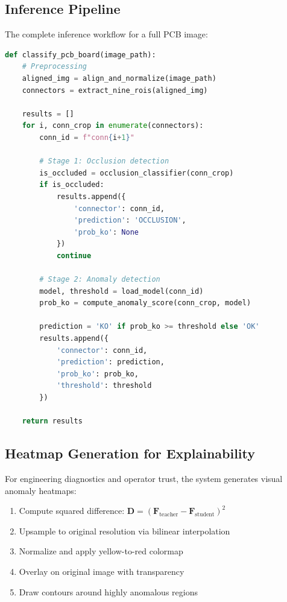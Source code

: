 \documentclass[11pt,a4paper,draft]{article}
\begin{document}
\subsection{Inference Pipeline}

The complete inference workflow for a full PCB image:

\begin{lstlisting}[language=Python, caption=Inference pipeline pseudocode]
def classify_pcb_board(image_path):
    # Preprocessing
    aligned_img = align_and_normalize(image_path)
    connectors = extract_nine_rois(aligned_img)
    
    results = []
    for i, conn_crop in enumerate(connectors):
        conn_id = f"conn{i+1}"
        
        # Stage 1: Occlusion detection
        is_occluded = occlusion_classifier(conn_crop)
        if is_occluded:
            results.append({
                'connector': conn_id,
                'prediction': 'OCCLUSION',
                'prob_ko': None
            })
            continue
        
        # Stage 2: Anomaly detection
        model, threshold = load_model(conn_id)
        prob_ko = compute_anomaly_score(conn_crop, model)
        
        prediction = 'KO' if prob_ko >= threshold else 'OK'
        results.append({
            'connector': conn_id,
            'prediction': prediction,
            'prob_ko': prob_ko,
            'threshold': threshold
        })
    
    return results
\end{lstlisting}

\subsection{Heatmap Generation for Explainability}

For engineering diagnostics and operator trust, the system generates visual anomaly heatmaps:

\begin{enumerate}
    \item Compute squared difference: $\mathbf{D} = (\mathbf{F}_{\text{teacher}} - \mathbf{F}_{\text{student}})^2$
    \item Upsample to original resolution via bilinear interpolation
    \item Normalize and apply yellow-to-red colormap
    \item Overlay on original image with transparency
    \item Draw contours around highly anomalous regions
\end{enumerate}
\end{document}
